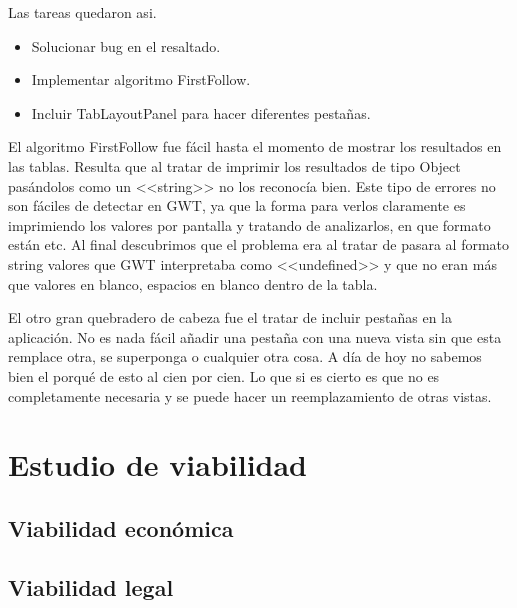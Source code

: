 Las tareas quedaron asi.

\begin{itemize}
\item Solucionar bug en el resaltado.
\item Implementar algoritmo FirstFollow.
\item Incluir TabLayoutPanel para hacer diferentes pestañas.
\end{itemize}

El algoritmo FirstFollow fue fácil hasta el momento de mostrar los resultados en las tablas. Resulta que al tratar de imprimir los resultados de tipo Object pasándolos como un <<string>> no los reconocía bien. Este tipo de errores no son fáciles de detectar en GWT, ya que la forma para verlos claramente es imprimiendo los valores por pantalla y tratando de analizarlos, en que formato están etc. Al final descubrimos que el problema era al tratar de pasara al formato string valores que GWT interpretaba como <<undefined>> y que no eran más que valores en blanco, espacios en blanco dentro de la tabla. 

El otro gran quebradero de cabeza fue el tratar de incluir pestañas en la aplicación. No es nada fácil añadir una pestaña con una nueva vista sin que esta remplace otra, se superponga o cualquier otra cosa. A día de hoy no sabemos bien el porqué de esto al cien por cien. Lo que si es cierto es que no es completamente necesaria y se puede hacer un reemplazamiento de otras vistas.

\section{Estudio de viabilidad}

\subsection{Viabilidad económica}

\subsection{Viabilidad legal}


